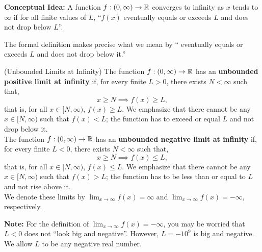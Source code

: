 \bigskip


\begin{tcolorbox}[colback=mylightblue, title = {\bf Infinite Limit at $\infty$}, breakable]

\textbf{Conceptual Idea:} A function $f:(0, \infty) \to \mathbb R$ converges to infinity as $x$ tends to $\infty$ if for all finite values of $L$, ``$f(x)$ eventually equals or exceeds $L$ and does not drop below $L$''. 

\bigskip

The formal definition makes precise what we mean by `` eventually equals or exceeds $L$ and does not drop below it.''

\begin{definition}
\label{def:LimitAtInfinity02}
(Unbounded Limits at Infinity) The function $f:(0,\infty) \to \mathbb R$ has an \textbf{unbounded positive limit at infinity} if, for every finite $L>0$, there exists $N< \infty$ such that,  
$$x\ge N \implies f(x) \ge L, $$
that is, for all $x \in [N, \infty)$, $f(x)\ge L$. We emphasize that there cannot be any $x \in [N, \infty)$ such that $f(x)< L$; the function has to exceed or equal $L$ and not drop below it. \\

The function $f:(0,\infty) \to \mathbb R$ has an \textbf{unbounded negative limit at infinity} if, for every finite $L<0$, there exists $N< \infty$ such that,  
$$x \ge N \implies f(x) \le L, $$
that is, for all $x \in [N, \infty)$, $f(x)\le L$. We emphasize that there cannot be any $x \in [N, \infty)$ such that $f(x)> L$; the function has to be less than or equal to $L$ and not rise above it. \\

We denote these limits by  $\displaystyle\lim_{x \to \infty} f(x) = \infty$ and $\displaystyle\lim_{x \to \infty} f(x) = -\infty$, respectively. 
\end{definition}

\textbf{Note:} For the definition of $\displaystyle\lim_{x \to \infty} f(x) = -\infty$, you may be worried that $L<0$ does not ``look big and negative''. However, $L=-10^9$ is big and negative. We allow $L$ to be any negative real number.

\end{tcolorbox}

\bigskip

